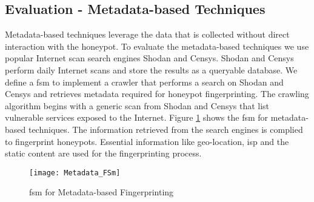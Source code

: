\subsection{Evaluation - Metadata-based Techniques}
Metadata-based techniques leverage the data that is collected without direct interaction with the honeypot. To evaluate the metadata-based techniques we use popular Internet scan search engines Shodan and Censys. Shodan and Censys perform daily Internet scans and store the results as a queryable database. We define a \acrshort{fsm} to implement a crawler that performs a search on Shodan and Censys and retrieves metadata required for honeypot fingerprinting. The crawling algorithm begins with a generic scan from Shodan and Censys that list vulnerable services exposed to the Internet. Figure \ref{fig:fsm_md} shows the \acrshort{fsm} for metadata-based techniques. The information retrieved from the search engines is complied to fingerprint honeypots. Essential information like geo-location, \acrshort{isp} and the static content are used for the fingerprinting process.

\begin{figure}[t]
    \centering
    \texttt{[image: Metadata\_FSm]}
    \caption{\acrshort{fsm} for Metadata-based Fingerprinting }
    \label{fig:fsm_md}
\end{figure}
